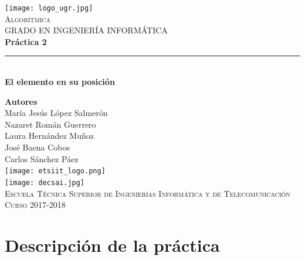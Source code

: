 \documentclass[12pt,spanish]{article}
\begin{document}
\begin{titlepage}

\newlength{\centeroffset}
\setlength{\centeroffset}{-0.5\oddsidemargin}
\addtolength{\centeroffset}{0.5\evensidemargin}
\thispagestyle{empty}

\noindent\hspace*{\centeroffset}
\begin{minipage}{\textwidth}

\centering
\texttt{[image: logo\_ugr.jpg]}\\[1.4cm]

\textsc{ \Large Algorítmica\\[0.2cm]}
\textsc{GRADO EN INGENIERÍA INFORMÁTICA}\\[1cm]

{\Huge\bfseries Práctica 2\\}
\noindent\rule[-1ex]{\textwidth}{3pt}\\[3.5ex]
{\large\bfseries El elemento en su posición}
\end{minipage}

\vspace{1.5cm}
\noindent\hspace*{\centeroffset}
\begin{minipage}{\textwidth}
\centering

\textbf{Autores}\\ {María Jesús López Salmerón \\ Nazaret Román Guerrero \\ Laura Hernández Muñoz \\ José Baena Cobos  \\ Carlos Sánchez Páez}\\[2.5ex]
\texttt{[image: etsiit\_logo.png]}\\[0.1cm]
\vspace{1.5cm}
\texttt{[image: decsai.jpg]}\\[0.1cm]
\vspace{1cm}
\textsc{Escuela Técnica Superior de Ingenierías Informática y de Telecomunicación}\\
\vspace{1cm}
\textsc{Curso 2017-2018}
\end{minipage}
\end{titlepage}
\tableofcontents
\thispagestyle{empty}
\listoffigures
\newpage
\setcounter{page}{1}
\section{Descripción de la práctica}
\end{document}

